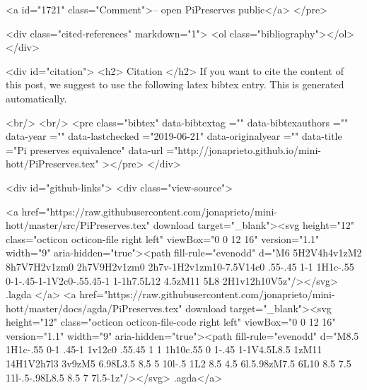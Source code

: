 <a id="1721" class="Comment">-- open PiPreserves public</a>
</pre>


  <div class="cited-references" markdown="1">
  <ol class="bibliography"></ol>
  </div>


  
  <div id="citation">
  <h2> Citation </h2>
  If you want to cite the content of this post,
  we suggest to use the following latex bibtex entry.
  This is generated automatically.

  <br/>
  <br/>
  <pre class="bibtex"
       data-bibtextag =""
       data-bibtexauthors =""
       data-year =""
       data-lastchecked ="2019-06-21"
       data-originalyear =""
       data-title ="Pi preserves equivalence"
       data-url ="http://jonaprieto.github.io/mini-hott/PiPreserves.tex"
  ></pre>
  </div>
  

  <div id="github-links">
    <div class="view-source">
      
        <a href="https://raw.githubusercontent.com/jonaprieto/mini-hott/master/src/PiPreserves.tex" download target="_blank"><svg height="12" class="octicon octicon-file right left" viewBox="0 0 12 16" version="1.1" width="9" aria-hidden="true"><path fill-rule="evenodd" d="M6 5H2V4h4v1zM2 8h7V7H2v1zm0 2h7V9H2v1zm0 2h7v-1H2v1zm10-7.5V14c0 .55-.45 1-1 1H1c-.55 0-1-.45-1-1V2c0-.55.45-1 1-1h7.5L12 4.5zM11 5L8 2H1v12h10V5z"/></svg> .lagda </a>
        <a href="https://raw.githubusercontent.com/jonaprieto/mini-hott/master/docs/agda/PiPreserves.tex" download target="_blank"><svg height="12" class="octicon octicon-file-code right left" viewBox="0 0 12 16" version="1.1" width="9" aria-hidden="true"><path fill-rule="evenodd" d="M8.5 1H1c-.55 0-1 .45-1 1v12c0 .55.45 1 1 1h10c.55 0 1-.45 1-1V4.5L8.5 1zM11 14H1V2h7l3 3v9zM5 6.98L3.5 8.5 5 10l-.5 1L2 8.5 4.5 6l.5.98zM7.5 6L10 8.5 7.5 11l-.5-.98L8.5 8.5 7 7l.5-1z"/></svg> .agda</a>
      
